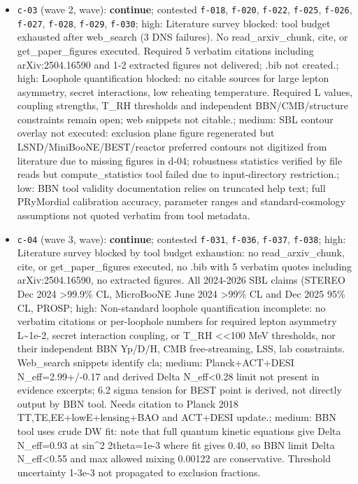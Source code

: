 \documentclass[11pt,a4paper]{article}
\begin{document}
\begin{itemize}
  \item \texttt{c-03} (wave 2, wave): \textbf{continue}; contested \texttt{f-018}, \texttt{f-020}, \texttt{f-022}, \texttt{f-025}, \texttt{f-026}, \texttt{f-027}, \texttt{f-028}, \texttt{f-029}, \texttt{f-030}; high: Literature survey blocked: tool budget exhausted after web\_search (3 DNS failures). No read\_arxiv\_chunk, cite, or get\_paper\_figures executed. Required 5 verbatim citations including arXiv:2504.16590 and 1-2 extracted figures not delivered; .bib not created.; high: Loophole quantification blocked: no citable sources for large lepton asymmetry, secret interactions, low reheating temperature. Required L values, coupling strengths, T\_RH thresholds and independent BBN/CMB/structure constraints remain open; web snippets not citable.; medium: SBL contour overlay not executed: exclusion plane figure regenerated but LSND/MiniBooNE/BEST/reactor preferred contours not digitized from literature due to missing figures in d-04; robustness statistics verified by file reads but compute\_statistics tool failed due to input-directory restriction.; low: BBN tool validity documentation relies on truncated help text; full PRyMordial calibration accuracy, parameter ranges and standard-cosmology assumptions not quoted verbatim from tool metadata.
  \item \texttt{c-04} (wave 3, wave): \textbf{continue}; contested \texttt{f-031}, \texttt{f-036}, \texttt{f-037}, \texttt{f-038}; high: Literature survey blocked by tool budget exhaustion: no read\_arxiv\_chunk, cite, or get\_paper\_figures executed, no .bib with 5 verbatim quotes including arXiv:2504.16590, no extracted figures. All 2024-2026 SBL claims (STEREO Dec 2024 \textgreater{}99.9\% CL, MicroBooNE June 2024 \textgreater{}99\% CL and Dec 2025 95\% CL, PROSP; high: Non-standard loophole quantification incomplete: no verbatim citations or per-loophole numbers for required lepton asymmetry L\textasciitilde{}1e-2, secret interaction coupling, or T\_RH \textless{}\textless{}100 MeV thresholds, nor their independent BBN Yp/D/H, CMB free-streaming, LSS, lab constraints. Web\_search snippets identify cla; medium: Planck+ACT+DESI N\_eff=2.99+/-0.17 and derived Delta N\_eff\textless{}0.28 limit not present in evidence excerpts; 6.2 sigma tension for BEST point is derived, not directly output by BBN tool. Needs citation to Planck 2018 TT,TE,EE+lowE+lensing+BAO and ACT+DESI update.; medium: BBN tool uses crude DW fit: note that full quantum kinetic equations give Delta N\_eff=0.93 at sin\textasciicircum{}2 2theta=1e-3 where fit gives 0.40, so BBN limit Delta N\_eff\textless{}0.55 and max allowed mixing 0.00122 are conservative. Threshold uncertainty 1-3e-3 not propagated to exclusion fractions.

\end{itemize}
\end{document}
